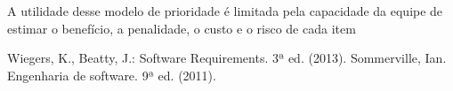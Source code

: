 \documentclass[runningheads]{llncs}
\begin{document}
A utilidade desse modelo de prioridade é limitada pela capacidade da equipe de estimar o benefício, a penalidade, o custo e o risco de cada item




%
%
%
% 
% 
%
\begin{thebibliography}{}
Wiegers, K., Beatty, J.: Software Requirements. 3ª ed. (2013).
Sommerville, Ian. Engenharia de software. 9ª ed. (2011).
\end{thebibliography}
\end{document}
